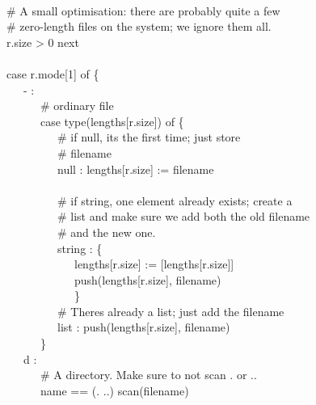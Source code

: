 {\ \\
\>   \ \ \ \# A small optimisation: there are probably quite a few \\
\>   \ \ \ \# zero-length files on the system; we ignore them all. \\
\>   \ \ \ r.size {\textgreater} 0 {\textbar} next \\
\ \\
\>   \ \ \ case r.mode[1] of \{ \\
\>   \ \ \ \ \ \ {\textquotedbl}-{\textquotedbl} : \\
\>   \ \ \ \ \ \ \ \ \ \# ordinary file \\
\>   \ \ \ \ \ \ \ \ \ case type(lengths[r.size]) of \{ \\
\>   \ \ \ \ \ \ \ \ \ \ \ \ \# if null, it{\textquotesingle}s the
first time; just store \\
\>   \ \ \ \ \ \ \ \ \ \ \ \ \# filename \\
\>   \ \ \ \ \ \ \ \ \ \ \ \ {\textquotedbl}null{\textquotedbl} :
lengths[r.size] := filename \\
\ \\
\>   \ \ \ \ \ \ \ \ \ \ \ \ \# if string, one element already exists;
create a \\
\>   \ \ \ \ \ \ \ \ \ \ \ \ \# list and make sure we add both the old
filename \\
\>   \ \ \ \ \ \ \ \ \ \ \ \ \# and the new one. \\
\>   \ \ \ \ \ \ \ \ \ \ \ \ {\textquotedbl}string{\textquotedbl} : \{ \\
\>   \ \ \ \ \ \ \ \ \ \ \ \ \ \ \ lengths[r.size] :=
[lengths[r.size]] \\
\>   \ \ \ \ \ \ \ \ \ \ \ \ \ \ \ push(lengths[r.size], filename) \\
\>   \ \ \ \ \ \ \ \ \ \ \ \ \ \ \ \} \\
\>   \ \ \ \ \ \ \ \ \ \ \ \ \# There{\textquotesingle}s already a
list; just add the filename \\
\>   \ \ \ \ \ \ \ \ \ \ \ \ {\textquotedbl}list{\textquotedbl} :
push(lengths[r.size], filename) \\
\>   \ \ \ \ \ \ \ \ \ \} \\
\>   \ \ \ \ \ \ {\textquotedbl}d{\textquotedbl} : \\
\>   \ \ \ \ \ \ \ \ \ \# A directory. Make sure to not scan . or .. \\
\>   \ \ \ \ \ \ \ \ \ name == ({\textquotedbl}.{\textquotedbl}
{\textbar} {\textquotedbl}..{\textquotedbl}) {\textbar} scan(filename) \\
}
